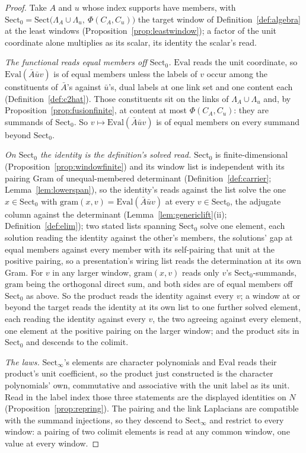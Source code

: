 \documentclass[11pt]{article}
\theoremstyle{definition}
\begin{document}
\begin{proof}
Take $A$ and $u$ whose index supports have members, with
$\mathrm{Sect}_0=\mathrm{Sect}\big(\Lambda_A\cup\Lambda_u,\ \Phi(C_A,C_u)\big)$
the target window of Definition~\ref{def:algebra} at the least
windows (Proposition~\ref{prop:leastwindow}); a factor of the unit
coordinate alone multiplies as its scalar, its identity the
scalar's read.

\emph{The functional reads equal members off $\mathrm{Sect}_0$.} $\mathrm{Eval}$ reads the unit
coordinate, so
$\mathrm{Eval}(\bar A\bar uv)$ is of equal members unless the labels of $v$ occur among the
constituents of $\bar A$'s against $\bar u$'s, dual labels at one
link set and one content each (Definition~\ref{def:c2hat}). Those constituents sit on the links
of $\Lambda_A\cup\Lambda_u$ and, by Proposition~\ref{prop:fusionfinite}, at
content at most $\Phi(C_A,C_u)$: they are summands of $\mathrm{Sect}_0$. So
$v\mapsto\mathrm{Eval}(\bar A\bar uv)$ is of equal members on every summand beyond $\mathrm{Sect}_0$.

\emph{On $\mathrm{Sect}_0$ the identity is the definition's solved read.} $\mathrm{Sect}_0$ is
finite-dimensional (Proposition~\ref{prop:windowfinite}) and its window list is
independent with its pairing Gram of unequal-membered determinant
(Definition~\ref{def:carrier}; Lemma~\ref{lem:lowerspan}), so
the identity's reads against the list solve the one
$x\in \mathrm{Sect}_0$ with
$\mathrm{gram}(x,v)=\mathrm{Eval}(\bar A\bar uv)$ at every $v\in \mathrm{Sect}_0$, the adjugate
column against the determinant
(Lemma~\ref{lem:genericlift}(ii); Definition~\ref{def:elim}); two
stated lists spanning $\mathrm{Sect}_0$ solve one element, each
solution reading the identity against the other's members, the
solutions' gap at equal members against every member with its
self-pairing that unit at the positive pairing, so
a presentation's wiring list reads the determination at its own
Gram. For $v$ in any larger window, $\mathrm{gram}(x,v)$ reads
only $v$'s $\mathrm{Sect}_0$-summands, $\mathrm{gram}$ being the orthogonal direct sum, and
both sides are of equal members off $\mathrm{Sect}_0$ as above. So the product reads the
identity against every $v$; a window at or beyond the target reads
the identity at its own list to one further solved element, each
reading the identity against every $v$, the two agreeing against
every element, one element at the positive pairing on the larger
window; and the product sits in $\mathrm{Sect}_0$ and descends to
the colimit.

\emph{The laws.} $\mathrm{Sect}_\infty$'s elements are character polynomials
and $\mathrm{Eval}$ reads their product's unit coefficient, so the product
just constructed is the character polynomials' own, commutative and
associative with the unit label as its unit. Read in the label index those three statements are
the displayed identities on $N$ (Proposition~\ref{prop:repring}). The pairing and the link Laplacians are
compatible with the summand injections, so they descend to $\mathrm{Sect}_\infty$
and restrict to every window: a pairing of two colimit elements is read at any
common window, one value at every window.
\end{proof}
\end{document}
